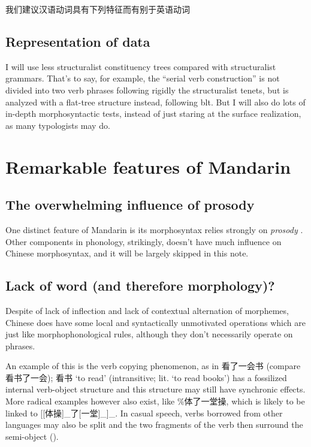 \documentclass[UTF8, a4paper, oneside, scheme=plain, 12pt]{ctexrep}
\newcommand{\translate}[1]{`#1'}
\begin{document}
\begin{exe}
    \ex\label{ex:weird-1} 我们建议汉语动词具有下列特征而有别于英语动词 \citep{huang2007}
\end{exe}

\subsection{Representation of data}

I will use less structuralist constituency trees compared with structuralist grammars.
That's to say, for example, 
the ``serial verb construction'' is not divided into two verb phrases 
following rigidly the structuralist tenets,
but is analyzed with a flat-tree structure instead,
following \acs{blt}.
But I will also do lots of in-depth morphosyntactic tests,
instead of just staring at the surface realization,
as many typologists may do.


\section{Remarkable features of Mandarin}

\subsection{The overwhelming influence of prosody}

One distinct feature of Mandarin is its morphosyntax relies strongly on \emph{prosody} \citep{feng2000}. 
Other components in phonology, strikingly, 
doesn't have much influence on Chinese morphosyntax,
and it will be largely skipped in this note.

\subsection{Lack of word (and therefore morphology)?}

Despite of lack of inflection
and lack of contextual alternation of morphemes,
Chinese does have some local and syntactically unmotivated operations
which are just like morphophonological rules,
although they don't necessarily operate on phrases.

An example of this is the verb copying phenomenon,
as in 看了一会书 (compare 看书了一会);
看书 \translate{to read} (intransitive; lit. \translate{to read books}) 
has a fossilized internal verb-object structure 
and this structure may still have synchronic effects.
More radical examples however also exist,
like \%体了一堂操, which is likely to be linked to 
[[体操]_{}了[一堂]_{}]_{}.
In casual speech,
verbs borrowed from other languages may also be split 
and the two fragments of the verb then surround the semi-object
().
\end{document}
